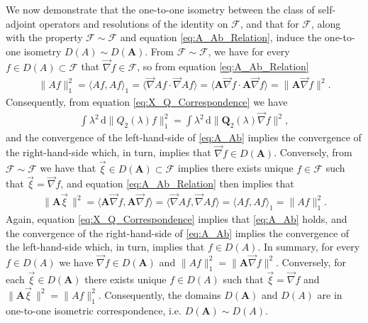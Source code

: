 \documentclass[11pt]{amsart}
\renewcommand{\d}{\mathrm{d}}
\newcommand{\Ab}{\mathbf{A}}
\newcommand{\Qb}{\mathbf{Q}}
\newcommand{\Fc}{\mathcal{F}}
\newcommand{\Fs}{\mathscr{F}}
\begin{document}
We now demonstrate that the one-to-one isometry between the class of
self-adjoint operators and resolutions of the identity on $\Fc$, and
that for $\Fs$, along with the property $\Fc\sim\Fs$ and equation
\eqref{eq:A_Ab_Relation}, induce the one-to-one isometry
$D(A)\sim D(\Ab)$. From $\Fc\sim\Fs$, we have for every $f\in D(A)\subset\Fc$ that 
$\vec{\nabla}f\in\Fs$, so from equation \eqref{eq:A_Ab_Relation} 
%
\begin{align}\label{eq:Norm_A_Ab}
  \|Af\|_1^2=\langle Af,Af\rangle_1
        =\langle\vec{\nabla} A f\cdot\vec{\nabla} A f\rangle
        =\langle\Ab\vec{\nabla}f\cdot\Ab\vec{\nabla}f\rangle
        =\|\Ab\vec{\nabla}f\|^2.
\end{align}
%
Consequently, from equation \eqref{eq:X_Q_Correspondence} we have 
%
\begin{align}\label{eq:A_Ab}
  \int\lambda^2\,\d\|Q_2(\lambda)f\|_1^2=\int\lambda^2\,\d\|\Qb_2(\lambda)\vec{\nabla}f\|^2,
\end{align}
%
and the convergence of the left-hand-side of \eqref{eq:A_Ab} implies
the convergence of the right-hand-side which, in turn, implies that
$\vec{\nabla}f\in D(\Ab)$. Conversely, from $\Fc\sim\Fs$ we have that $\vec{\xi}\in
D(\Ab)\subset\Fs$ implies there exists  
unique $f\in\Fc$ such that $\vec{\xi}=\vec{\nabla}f$, and equation
\eqref{eq:A_Ab_Relation} then implies that   
%
\begin{align}
  \|\Ab\vec{\xi}\,\|^2=\langle\Ab\vec{\nabla}f,\Ab\vec{\nabla}f\rangle
         =\langle\vec{\nabla} A f,\vec{\nabla} A f\rangle
         =\langle Af,Af\rangle_1
         =\|Af\|_1^2.
\end{align}
%
Again, equation \eqref{eq:X_Q_Correspondence} implies that
\eqref{eq:A_Ab} holds, and the convergence of the right-hand-side of
\eqref{eq:A_Ab} implies the 
convergence of the left-hand-side which, in turn, implies that
$f\in D(A)$. In summary, for every $f\in
D(A)$ we have $\vec{\nabla}f\in D(\Ab)$ and
$\|Af\|_1^2=\|\Ab\vec{\nabla}f\|^2$. Conversely, for each $\vec{\xi}\in D(\Ab)$ there
exists unique $f\in D(A)$ such that $\vec{\xi}=\vec{\nabla}f$ and
$\|\Ab\vec{\xi}\,\|^2=\|Af\|_1^2$. Consequently, the domains $D(\Ab)$ and $D(A)$
are in one-to-one isometric correspondence, i.e. $D(\Ab)\sim D(A)$.     
\end{document}

